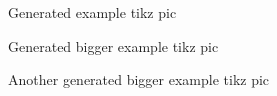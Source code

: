 \documentclass[12pt,a4paper,oneside]{article}
\begin{document}
\begin{figure}[ht!]
	\centering
	
	\caption{Generated example tikz pic}
\end{figure}
\clearpage
\begin{figure}[ht!]
	\centering
	
	\caption{Generated bigger example tikz pic}
\end{figure}
\begin{figure}[ht!]
	\centering
	
	\caption{Another generated bigger example tikz pic}
\end{figure}
\end{document}
